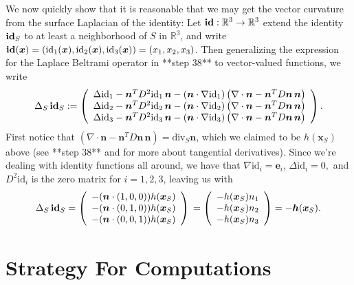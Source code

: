 \documentclass[10pt]{article}
\newcommand{\R}{\mathbb{R}}
\newcommand{\mbf}[1]{\boldsymbol{#1}}
\begin{document}
We now quickly show that it is reasonable that we may get the vector curvature
from the surface Laplacian of the identity: Let $\text{\bf id} : \R^3 \to \R^3$
extend the identity $\text{\bf id}_S$ to at least a neighborhood of $S$ in $\R^3$, and write $\text{\bf
id}(\mbf{x}) = \left( \text{id}_1(\mbf{x}), \text{id}_2(\mbf{x}),\text{id}_3(\mbf{x}) \right) = \left( x_1, x_2, x_3 \right)$. Then generalizing the
expression for the Laplace Beltrami operator in **step 38** to vector-valued
functions, we write
\[
 \Delta_S \, \text{\bf id}_S :=
  \left( \begin{array}{c} 
     \Delta \text{id}_1  - \mbf{n}^T D^2 \text{id}_1 \, \mbf{n} - (\mbf{n} \cdot \nabla \text{id}_1)\left( \nabla \cdot \mbf{n} - \mbf{n}^T D\mbf{n} \, \mbf{n} \right) \\ 
     \Delta \text{id}_2  - \mbf{n}^T D^2 \text{id}_2 \, \mbf{n} - (\mbf{n} \cdot \nabla \text{id}_2)\left( \nabla \cdot \mbf{n} - \mbf{n}^T D\mbf{n} \, \mbf{n} \right) \\ 
     \Delta \text{id}_3  - \mbf{n}^T D^2 \text{id}_3 \, \mbf{n} - (\mbf{n} \cdot \nabla \text{id}_3)\left( \nabla \cdot \mbf{n} - \mbf{n}^T D\mbf{n} \, \mbf{n} \right) 
  \end{array} \right). 
\]
First notice that $\left( \nabla \cdot \mbf{n} - \mbf{n}^T D\mbf{n} \, \mbf{n}
\right) = \text{div}_{S} \mbf{n}$, which we claimed to be $h(\mbf{x}_S)$ above
(see **step 38** and \cite{} for more about tangential derivatives).  Since
we're dealing with identity functions all around, we have that $\nabla
\text{id}_i = \mbf{e}_i$,  $\Delta \text{id}_i = 0,$ and
$D^2 \text{id}_i$ is the zero matrix for $i=1,2,3$, leaving us with 
\[
 \Delta_S \, \text{\bf id}_S =
  \left( \begin{array}{c} 
     - (\mbf{n} \cdot \left( 1,0,0 \right)) h(\mbf{x}_S)  \\ 
     - (\mbf{n} \cdot \left( 0,1,0 \right)) h(\mbf{x}_S)  \\ 
     - (\mbf{n} \cdot \left( 0,0,1 \right)) h(\mbf{x}_S) 
  \end{array} \right) \\
  = 
  \left( \begin{array}{c} 
     - h(\mbf{x}_S) n_1  \\ 
     - h(\mbf{x}_S) n_2  \\ 
     - h(\mbf{x}_S) n_3 
  \end{array} \right) 
  = - \mbf{h}(\mbf{x}_S).
\]

\section*{Strategy For Computations}
\end{document}
